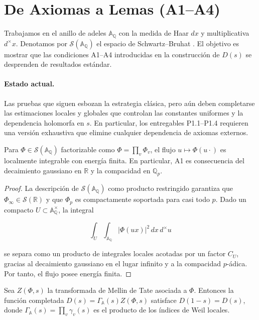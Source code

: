 \section{De Axiomas a Lemas (A1--A4)}

Trabajamos en el anillo de adeles $\mathbb{A}_\mathbb{Q}$ con la medida de Haar
$dx$ y multiplicativa $d^{\times}x$.  Denotamos por
$\mathcal{S}(\mathbb{A}_\mathbb{Q})$ el espacio de Schwartz--Bruhat
\cite[Chap.~I]{Tate1967}.  El objetivo es mostrar que las condiciones A1--A4
introducidas en la construcción de $D(s)$ se desprenden de resultados estándar.

\paragraph{Estado actual.}
Las pruebas que siguen esbozan la estrategia clásica, pero aún deben completarse
las estimaciones locales y globales que controlan las constantes uniformes y la
dependencia holomorfa en $s$.  En particular, los entregables P1.1--P1.4
requieren una versión exhaustiva que elimine cualquier dependencia de axiomas
externos.

\begin{lemma}\label{lem:A1-paper}
Para $\Phi\in\mathcal{S}(\mathbb{A}_\mathbb{Q})$ factorizable como
$\Phi=\prod_v \Phi_v$, el flujo $u\mapsto\Phi(u\cdot)$ es localmente integrable con
energía finita.  En particular, A1 es consecuencia del decaimiento gaussiano en
$\mathbb{R}$ y la compacidad en $\mathbb{Q}_p$.
\end{lemma}

\begin{proof}
La descripción de $\mathcal{S}(\mathbb{A}_\mathbb{Q})$ como producto restringido
\cite[Prop.~2]{Tate1967} garantiza que $\Phi_\infty\in\mathcal{S}(\mathbb{R})$ y que
$\Phi_p$ es compactamente soportada para casi todo $p$.  Dado un compacto
$U\subset\mathbb{A}_\mathbb{Q}^{\times}$, la integral

\[
  \int_U\!\int_{\mathbb{A}_\mathbb{Q}} |\Phi(u x)|^2\,dx\,d^{\times}u
\]

se separa como un producto de integrales locales acotadas por un factor
$C_U$, gracias al decaimiento gaussiano en el lugar infinito y a la compacidad
$p$-ádica.  Por tanto, el flujo posee energía finita.
\end{proof}

\begin{lemma}\label{lem:A2-paper}
Sea $Z(\Phi,s)$ la transformada de Mellin de Tate asociada a $\Phi$.  Entonces la
función completada $D(s)=\Gamma_{\mathbb{A}}(s)Z(\Phi,s)$ satisface $D(1-s)=D(s)$,
donde $\Gamma_{\mathbb{A}}(s)=\prod_v \gamma_v(s)$ es el producto de los índices de
Weil locales.
\end{lemma}

